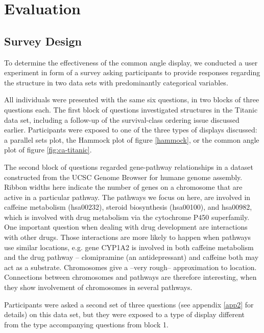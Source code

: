 \section{Evaluation}
\subsection{Survey Design}
To determine the effectiveness of the common angle display, we conducted a user experiment in form of a survey asking participants to provide responses regarding the structure in two data sets with predominantly categorical variables.

 All individuals were presented with the same six questions, in two blocks of three questions each. The first block of questions investigated structures in the Titanic data set, including a follow-up of the survival-class ordering issue discussed earlier. Participants were exposed to one of the three types of displays discussed: a parallel sets plot, the Hammock plot of figure \ref{hammock}, or the common angle plot of  figure \ref{fig:ca-titanic}.
 
The second block  of questions regarded gene-pathway relationships in a dataset constructed from the UCSC Genome Browser \cite{ucsc:2002} for humane genome assembly. Ribbon widths here indicate the number of genes on a  chromosome that are active in a particular pathway. The pathways we focus on here, are involved in caffeine metabolism (hsa00232),  steroid biosynthesis (hsa00100), and hsa00982, which is involved with drug metabolism via the cytochrome P450 superfamily.  One important question when dealing with drug development are interactions with other drugs. Those interactions are more likely to happen when pathways use similar locations, e.g. gene CYP1A2 is involved in both  caffeine metabolism and the drug pathway -- clomipramine (an antidepressant) and caffeine both may act as a substrate. Chromosomes give a --very rough-- approximation to location. Connections between chromosomes and pathways are therefore interesting, when they show involvement of chromosomes in several pathways.
 
 
Participants were asked a second set of three questions (see appendix \ref{app2} for details) on this data set, but they were exposed to a  type of display different from the type accompanying questions from block 1.
  
